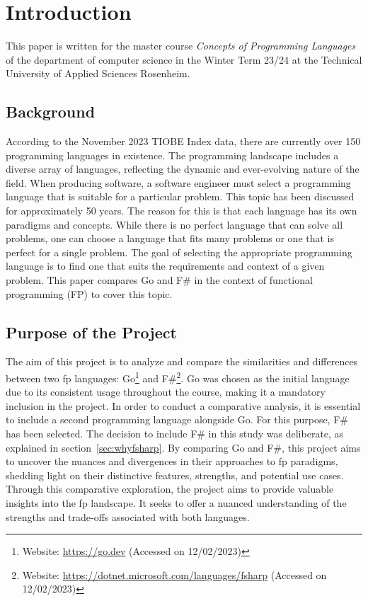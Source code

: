 
\chapter{Introduction}\label{chap:introduction}
This paper is written for the master course \textit{Concepts of Programming Languages} of the department of computer science in the Winter Term 23/24 at the Technical University of Applied Sciences Rosenheim.
    
    \section{Background}\label{sec:background}
    According to the November 2023 TIOBE Index data, there are currently over 150 programming languages in existence. The programming landscape includes a diverse array of languages, reflecting the dynamic and ever-evolving nature of the field.\cite{Tiobeindex} When producing software, a software engineer must select a programming language that is suitable for a particular problem. This topic has been discussed for approximately 50 years.\cite{Tharp1982} The reason for this is that each language has its own paradigms and concepts. While there is no perfect language that can solve all problems, one can choose a language that fits many problems or one that is perfect for a single problem. The goal of selecting the appropriate programming language is to find one that suits the requirements and context of a given problem. This paper compares Go and F\# in the context of functional programming (FP) to cover this topic.

    \section{Purpose of the Project}\label{sec:purpose}
    The aim of this project is to analyze and compare the similarities and differences between two \ac{fp} languages: Go\footnote{Website: \url{https://go.dev} (Accessed on 12/02/2023)} and F\#\footnote{Website: \url{https://dotnet.microsoft.com/languages/fsharp} (Accessed on 12/02/2023)}. Go was chosen as the initial language due to its consistent usage throughout the course, making it a mandatory inclusion in the project. In order to conduct a comparative analysis, it is essential to include a second programming language alongside Go. For this purpose, F\# has been selected. The decision to include F\# in this study was deliberate, as explained in section\ \ref{sec:whyfsharp}. By comparing Go and F\#, this project aims to uncover the nuances and divergences in their approaches to \ac{fp} paradigms, shedding light on their distinctive features, strengths, and potential use cases. Through this comparative exploration, the project aims to provide valuable insights into the \ac{fp} landscape. It seeks to offer a nuanced understanding of the strengths and trade-offs associated with both languages.

